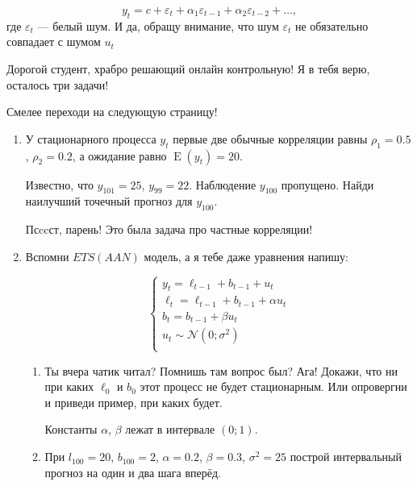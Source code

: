 \documentclass[12pt]{article}
\DeclareMathOperator{\E}{E}
\def \cN{\mathcal{N}}
\begin{document}
\begin{enumerate}
\begin{enumerate}
	\[
	y_t = c + \varepsilon_t + \alpha_1 \varepsilon_{t-1} + \alpha_2 \varepsilon_{t-2} + \ldots,
	\]
	где $\varepsilon_t$ — белый шум. 
	И да, обращу внимание, что шум $\varepsilon_t$ не обязательно совпадает с шумом $u_t$
\end{enumerate}

\end{enumerate}

Дорогой студент, храбро решающий онлайн контрольную! Я в тебя верю, осталось три задачи!

Смелее переходи на следующую страницу!
\newpage

\begin{enumerate}[resume]

\item У стационарного процесса $y_t$ первые две обычные корреляции равны $\rho_1 = 0.5$, $\rho_2 = 0.2$,
а ожидание равно $\E(y_t) = 20$. 

Известно, что $y_{101} = 25$, $y_{99} = 22$. Наблюдение $y_{100}$ пропущено. 
Найди наилучший точечный прогноз для $y_{100}$.


Псccст, парень! Это была задача про частные корреляции! 

\item Вспомни $ETS(AAN)$ модель, а я тебе даже уравнения напишу:

\[
\begin{cases}
y_t = \ell_{t-1} + b_{t-1} + u_t \\
\ell_t = \ell_{t-1} + b_{t-1} + \alpha u_t \\
b_t = b_{t-1} + \beta u_t \\
u_t \sim \cN(0;\sigma^2) \\
\end{cases}
\]

\begin{enumerate}
	\item Ты вчера чатик читал? Помнишь там вопрос был? Ага! 
	Докажи, что ни при каких $\ell_0$ и $b_0$ этот процесс не будет стационарным. 
	Или опровергни и приведи пример, при каких будет. 
	
	Константы $\alpha$, $\beta$ лежат в интервале $(0;1)$.
	
	\item При $l_{100} = 20$, $b_{100} = 2$, $\alpha=0.2$, $\beta=0.3$, $\sigma^2 = 25$ построй
	интервальный прогноз на один и два шага вперёд. 
\end{enumerate}




\end{enumerate}
\end{document}
